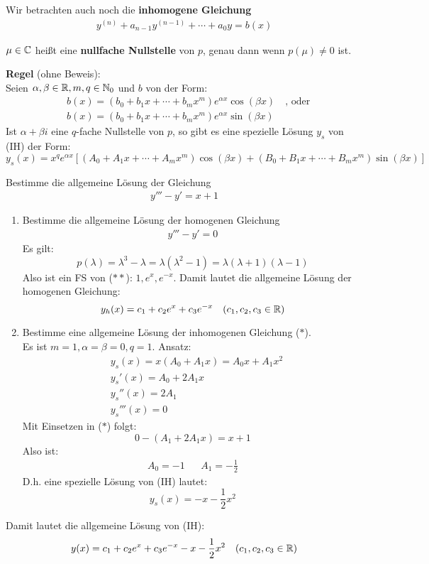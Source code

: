 \documentclass[a4paper,oneside,DIV15,BCOR12mm,chapterprefix=true,headings=onelinechapter]{scrbook}
\begin{document}
Wir betrachten auch noch die \textbf{inhomogene Gleichung}
\begin{align*}
\tag{IH} y^{(n)}+a_{n-1}y^{(n-1)}+\cdots+a_0y=b(x)
\end{align*}

\begin{definition}
$\mu\in\mathbb{C}$ heißt eine \textbf{nullfache Nullstelle} von $p$, genau dann wenn
$p(\mu)\ne 0$ ist.
\end{definition}

\textbf{Regel} (ohne Beweis):\\
Seien $\alpha,\beta\in\mathbb{R},m,q\in\mathbb{N}_0$ und $b$ von der Form:
\begin{align*}
&b(x)=(b_0+b_1x+\cdots+b_mx^m)e^{\alpha x}\cos(\beta x)\quad\text{, oder}\\
&b(x)=(b_0+b_1x+\cdots+b_mx^m)e^{\alpha x}\sin(\beta x)
\end{align*}
Ist $\alpha+\beta i$ eine $q$-fache Nullstelle von $p$, so gibt es eine spezielle Lösung
$y_s$ von (IH) der Form:
\[y_s(x)=x^qe^{\alpha x}\left[(A_0+A_1x+\cdots+A_mx^m)\cos(\beta x)+(B_0+B_1x+\cdots+B_mx^m)\sin(\beta x)\right]\]

\begin{beispiel}
Bestimme die allgemeine Lösung der Gleichung
\begin{align*}
y'''-y'=x+1\tag{$*$}
\end{align*}
\begin{enumerate}
\item Bestimme die allgemeine Lösung der homogenen Gleichung
\begin{align*}
y'''-y'=0\tag{$**$}
\end{align*}
Es gilt:
\[p(\lambda)=\lambda^3-\lambda=\lambda(\lambda^2-1)=\lambda(\lambda+1)(\lambda-1)\]
Also ist ein FS von ($**$): $1,e^x,e^{-x}$. Damit lautet die allgemeine Lösung der homogenen
Gleichung:
\[y_h(x)=c_1+c_2e^x+c_3e^{-x}\quad(c_1,c_2,c_3\in\mathbb{R})\]
\item Bestimme eine allgemeine Lösung der inhomogenen Gleichung ($*$).\\ 
Es ist $m=1,\alpha=\beta=0,q=1$. Ansatz:
\begin{align*}
&y_s(x)=x(A_0+A_1x)=A_0x+A_1x^2\\
&y_s'(x)=A_0+2A_1x\\
&y_s''(x)=2A_1\\
&y_s'''(x)=0
\end{align*}
Mit Einsetzen in ($*$) folgt:
\[0-(A_1+2A_1x)=x+1\]
Also ist:
\begin{align*}
A_0=-1&&A_1=-\frac12
\end{align*}
D.h. eine spezielle Lösung von (IH) lautet:
\[y_s(x)=-x-\frac12 x^2\]
\end{enumerate}
Damit lautet die allgemeine Lösung von (IH):
\[y(x)=c_1+c_2e^x+c_3e^{-x}-x-\frac12 x^2\quad(c_1,c_2,c_3\in\mathbb{R})\]
\end{beispiel}
\end{document}
